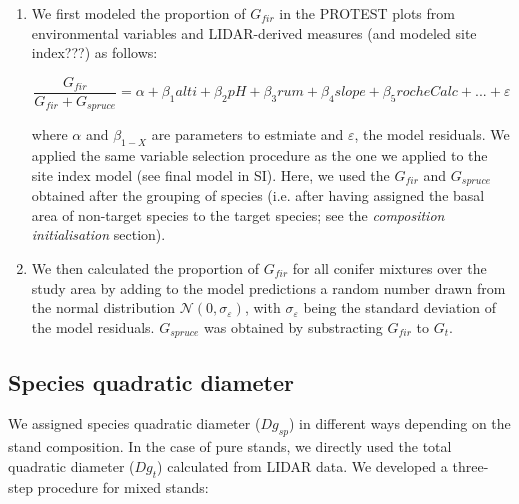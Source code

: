 \documentclass[a4paper]{article}
\begin{document}
\begin{enumerate}

  \item We first modeled the proportion of $G_{fir}$ in the PROTEST plots from environmental variables and LIDAR-derived measures (and modeled site index???) as follows:

  \begin{equation}\label{gfir-spruce}
    \frac{G_{fir}}{G_{fir} + G_{spruce}} = \alpha + \beta_1 alti + \beta_2 pH +\beta_3 rum +\beta_4 slope +\beta_5 rocheCalc+...+ \varepsilon
  \end{equation}

  \noindent where $\alpha$ and $\beta_{1-X}$ are parameters to estmiate and $\varepsilon$, the model residuals. We applied the same variable selection procedure as the one we applied to the site index model (see final model in SI). Here, we used the $G_{fir}$ and $G_{spruce}$ obtained after the grouping of species (i.e. after having assigned the basal area of non-target species to the target species; see the \textit{composition initialisation} section).

  \item We then calculated the proportion of $G_{fir}$ for all conifer mixtures over the study area by adding to the model predictions a random number drawn from the normal distribution $\mathcal{N} (0, \sigma_\varepsilon)$, with $\sigma_\varepsilon$ being the standard deviation of the model residuals. $G_{spruce}$ was obtained by substracting $G_{fir}$ to $G_t$.

\end{enumerate}


\subsection*{Species quadratic diameter}\label{Dg}

We assigned species quadratic diameter ($Dg_{sp}$) in different ways depending on the stand composition. In the case of pure stands, we directly used the total quadratic diameter ($Dg_t$) calculated from LIDAR data. We developed a three-step procedure for mixed stands:
\end{document}
